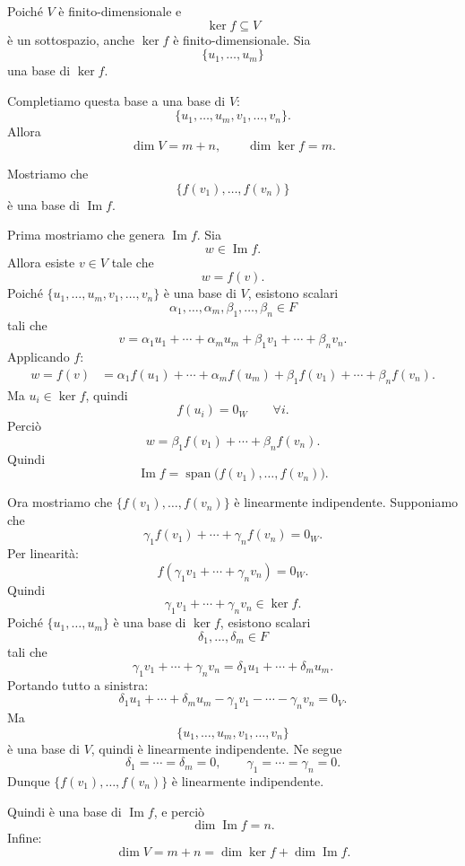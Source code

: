 \documentclass[a4paper]{article}
\begin{document}
\begin{snippetproof}{}
    Poiché \(V\) è finito-dimensionale e
    \[
        \ker f\subseteq V
    \]
    è un sottospazio, anche \(\ker f\) è finito-dimensionale. Sia
    \[
        \{u_1,\ldots,u_m\}
    \]
    una base di \(\ker f\).

    Completiamo questa base a una base di \(V\):
    \[
        \{u_1,\ldots,u_m,v_1,\ldots,v_n\}.
    \]
    Allora
    \[
        \dim V=m+n,
        \qquad
        \dim\ker f=m.
    \]

    Mostriamo che
    \[
        \{f(v_1),\ldots,f(v_n)\}
    \]
    è una base di \(\operatorname{Im}f\).

    Prima mostriamo che genera \(\operatorname{Im}f\). Sia
    \[
        w\in\operatorname{Im}f.
    \]
    Allora esiste \(v\in V\) tale che
    \[
        w=f(v).
    \]
    Poiché \(\{u_1,\ldots,u_m,v_1,\ldots,v_n\}\) è una base di \(V\), esistono scalari
    \[
        \alpha_1,\ldots,\alpha_m,\beta_1,\ldots,\beta_n\in F
    \]
    tali che
    \[
        v
        =
        \alpha_1u_1+\cdots+\alpha_mu_m
        +
        \beta_1v_1+\cdots+\beta_nv_n.
    \]
    Applicando \(f\):
    \begin{align*}
        w=f(v)
        &=
        \alpha_1f(u_1)+\cdots+\alpha_mf(u_m)
        +
        \beta_1f(v_1)+\cdots+\beta_nf(v_n).
    \end{align*}
    Ma \(u_i\in\ker f\), quindi
    \[
        f(u_i)=0_W
        \qquad
        \forall i.
    \]
    Perciò
    \[
        w
        =
        \beta_1f(v_1)+\cdots+\beta_nf(v_n).
    \]
    Quindi
    \[
        \operatorname{Im}f
        =
        \operatorname{span}\bigl(f(v_1),\ldots,f(v_n)\bigr).
    \]

    Ora mostriamo che \(\{f(v_1),\ldots,f(v_n)\}\) è linearmente indipendente. Supponiamo che
    \[
        \gamma_1f(v_1)+\cdots+\gamma_nf(v_n)=0_W.
    \]
    Per linearità:
    \[
        f(\gamma_1v_1+\cdots+\gamma_nv_n)=0_W.
    \]
    Quindi
    \[
        \gamma_1v_1+\cdots+\gamma_nv_n\in\ker f.
    \]
    Poiché \(\{u_1,\ldots,u_m\}\) è una base di \(\ker f\), esistono scalari
    \[
        \delta_1,\ldots,\delta_m\in F
    \]
    tali che
    \[
        \gamma_1v_1+\cdots+\gamma_nv_n
        =
        \delta_1u_1+\cdots+\delta_mu_m.
    \]
    Portando tutto a sinistra:
    \[
        \delta_1u_1+\cdots+\delta_mu_m
        -
        \gamma_1v_1-\cdots-\gamma_nv_n
        =
        0_V.
    \]
    Ma
    \[
        \{u_1,\ldots,u_m,v_1,\ldots,v_n\}
    \]
    è una base di \(V\), quindi è linearmente indipendente. Ne segue
    \[
        \delta_1=\cdots=\delta_m=0,
        \qquad
        \gamma_1=\cdots=\gamma_n=0.
    \]
    Dunque \(\{f(v_1),\ldots,f(v_n)\}\) è linearmente indipendente.

    Quindi è una base di \(\operatorname{Im}f\), e perciò
    \[
        \dim\operatorname{Im}f=n.
    \]
    Infine:
    \[
        \dim V=m+n
        =
        \dim\ker f+\dim\operatorname{Im}f.
    \]
\end{snippetproof}
\end{document}
